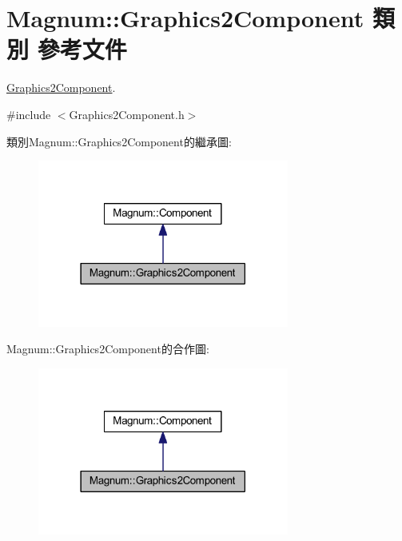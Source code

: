 \hypertarget{class_magnum_1_1_graphics2_component}{}\section{Magnum\+:\+:Graphics2\+Component 類別 參考文件}
\label{class_magnum_1_1_graphics2_component}


\hyperlink{class_magnum_1_1_graphics2_component}{Graphics2\+Component}.  




{\ttfamily \#include $<$Graphics2\+Component.\+h$>$}



類別\+Magnum\+:\+:Graphics2\+Component的繼承圖\+:\nopagebreak
\begin{figure}[H]
\begin{center}
\leavevmode
\includegraphics[width=234pt]{class_magnum_1_1_graphics2_component__inherit__graph}
\end{center}
\end{figure}


Magnum\+:\+:Graphics2\+Component的合作圖\+:\nopagebreak
\begin{figure}[H]
\begin{center}
\leavevmode
\includegraphics[width=234pt]{class_magnum_1_1_graphics2_component__coll__graph}
\end{center}
\end{figure}
